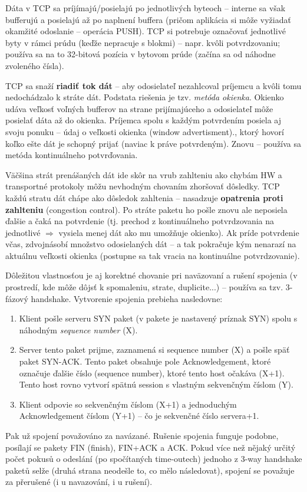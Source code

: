Dáta v TCP sa príjímajú/posielajú po jednotlivých byteoch -- interne sa však bufferujú a posielajú až po naplnení buffera (pričom aplikácia si môže vyžiadať okamžité odoslanie -- operácia PUSH). TCP si potrebuje označovať jednotlivé byty v rámci prúdu (keďže nepracuje s blokmi) -- napr. kvôli potvrdzovaniu; používa sa na to 32-bitová pozícia v bytovom prúde (začína sa od náhodne zvoleného čísla).

TCP sa snaží \textbf{riadiť tok dát} -- aby odosielateľ nezahlcoval príjemcu a kvôli tomu nedochádzalo k stráte dát. Podstata riešenia je tzv. \emph{metóda okienka}. Okienko udáva veľkosť voľných bufferov na strane prijímajúceho a odosielateľ môže posielať dáta až do  okienka. Príjemca spolu s každým potvrdením posiela aj svoju ponuku -- údaj o veľkosti okienka (window advertisment)., ktorý hovorí koľko ešte dát je schopný prijať (naviac k práve potvrdeným). Znovu -- používa sa metóda kontinuálneho potvrďovania.

Väčšina strát prenášaných dát ide skôr na vrub zahlteniu ako chybám HW a transportné protokoly môžu nevhodným chovaním zhoršovať dôsledky. TCP každú stratu dát chápe ako dôsledok zahltenia -- nasadzuje \textbf{opatrenia proti zahlteniu} (congestion control). Po stráte paketu ho pošle znovu ale neposiela ďalšie a čaká na potvrdenie (tj. prechod z kontinuálneho potvrdzovania na jednotlivé $\Rightarrow$ vysiela menej dát ako mu umožňuje okienko). Ak príde potvrdenie včas, zdvojnásobí množstvo odosielaných dát -- a tak pokračuje kým nenarazí na aktuálnu veľkosti okienka (postupne sa tak vracia na kontinuálne potvrdzovanie).

Dôležitou vlastnosťou je aj korektné chovanie pri naväzovaní a rušení spojenia (v prostredí, kde môže dôjsť k spomaleniu, strate, duplicite...) -- používa sa tzv. 3-fázový handshake. Vytvorenie spojenia prebieha nasledovne:
\begin{enumerate}
	\item Klient pošle serveru SYN paket (v pakete je nastavený príznak SYN) spolu s náhodným \emph{sequence number} (X).
	\item Server tento paket prijme, zaznamená si sequence number (X) a pošle späť paket SYN-ACK. Tento paket obsahuje pole Acknowledgement, ktoré označuje ďalšie číslo (sequence number), ktoré tento host očakáva (X+1). Tento host rovno vytvorí spätnú session s vlastným sekvenčným číslom (Y).
	\item Klient odpovie so sekvenčným číslom (X+1) a jednoduchým Acknowledgement číslom (Y+1) -- čo je sekvenčné číslo servera+1.
\end{enumerate}
Pak už spojení považováno za navázané. Rušenie spojenia funguje podobne, posílají se pakety FIN (finish), FIN+ACK a ACK. Pokud více než nějaký určitý počet pokusů o odeslání (po spočítaných time-outech) jednoho z 3-way handshake paketů selže (druhá strana neodešle to, co mělo následovat), spojení se považuje za přerušené (i u navazování, i u rušení).

